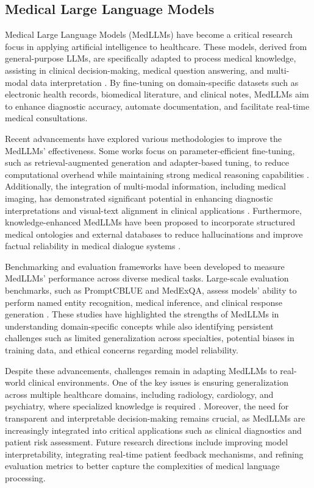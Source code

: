 \subsection{Medical Large Language Models}

Medical Large Language Models (MedLLMs) have become a critical research focus in applying artificial intelligence to healthcare. These models, derived from general-purpose LLMs, are specifically adapted to process medical knowledge, assisting in clinical decision-making, medical question answering, and multi-modal data interpretation \cite{Buhnila2024,He2024}. By fine-tuning on domain-specific datasets such as electronic health records, biomedical literature, and clinical notes, MedLLMs aim to enhance diagnostic accuracy, automate documentation, and facilitate real-time medical consultations.

Recent advancements have explored various methodologies to improve the MedLLMs' effectiveness. Some works focus on parameter-efficient fine-tuning, such as retrieval-augmented generation and adapter-based tuning, to reduce computational overhead while maintaining strong medical reasoning capabilities \cite{Ma2024,Zhang2024}. Additionally, the integration of multi-modal information, including medical imaging, has demonstrated significant potential in enhancing diagnostic interpretations and visual-text alignment in clinical applications \cite{Bai2024}. Furthermore, knowledge-enhanced MedLLMs have been proposed to incorporate structured medical ontologies and external databases to reduce hallucinations and improve factual reliability in medical dialogue systems \cite{Wu2024,Liao2024}.

Benchmarking and evaluation frameworks have been developed to measure MedLLMs' performance across diverse medical tasks. Large-scale evaluation benchmarks, such as PromptCBLUE and MedExQA, assess models' ability to perform named entity recognition, medical inference, and clinical response generation \cite{Zhu2023,Kim2024}. These studies have highlighted the strengths of MedLLMs in understanding domain-specific concepts while also identifying persistent challenges such as limited generalization across specialties, potential biases in training data, and ethical concerns regarding model reliability.

Despite these advancements, challenges remain in adapting MedLLMs to real-world clinical environments. One of the key issues is ensuring generalization across multiple healthcare domains, including radiology, cardiology, and psychiatry, where specialized knowledge is required \cite{Panagoulias2024}. Moreover, the need for transparent and interpretable decision-making remains crucial, as MedLLMs are increasingly integrated into critical applications such as clinical diagnostics and patient risk assessment. Future research directions include improving model interpretability, integrating real-time patient feedback mechanisms, and refining evaluation metrics to better capture the complexities of medical language processing.